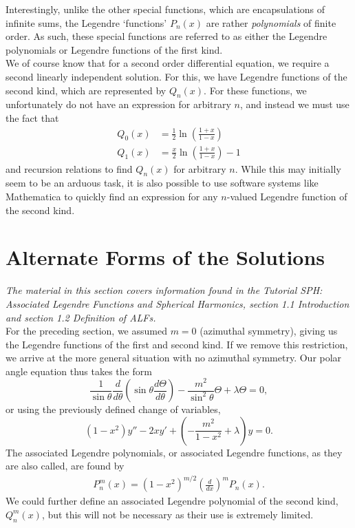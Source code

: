 \documentclass[11pt]{report}
\newcommand{\fpar}[1]{\left({#1}\right)}
\begin{document}
Interestingly, unlike the other special functions, which are encapsulations of infinite sums, the Legendre `functions' $P_n\fpar{x}$ are rather \emph{polynomials} of finite order. As such, these special functions are referred to as either the Legendre polynomials or Legendre functions of the first kind.\\

We of course know that for a second order differential equation, we require a second linearly independent solution. For this, we have Legendre functions of the second kind, which are represented by $Q_n(x)$. For these functions, we unfortunately do not have an expression for arbitrary $n$, and instead we must use the fact that
    \begin{align}
        Q_0(x) &= \frac{1}{2}\ln\fpar{\frac{1+x}{1-x}}\\
        Q_1(x) &= \frac{x}{2}\ln\fpar{\frac{1+x}{1-x}}-1
    \end{align}
and recursion relations to find $Q_n\fpar{x}$ for arbitrary $n$. While this may initially seem to be an arduous task, it is also possible to use software systems like Mathematica to quickly find an expression for any $n$-valued Legendre function of the second kind.

\section{Alternate Forms of the Solutions}

\emph{The material in this section covers information found in the Tutorial SPH: Associated Legendre Functions and Spherical Harmonics, section 1.1 Introduction and section 1.2 Definition of ALFs.}\\


For the preceding section, we assumed $m=0$ (azimuthal symmetry), giving us the Legendre functions of the first and second kind. If we remove this restriction, we arrive at the more general situation with no azimuthal symmetry. Our polar angle equation thus takes the form
    \begin{equation}
        \frac{1}{\sin{\theta}}\frac{d}{d\theta}\left(\sin{\theta}\frac{d\Theta}{d\theta}\right) - \frac{m^2}{\sin^2{\theta}}\Theta + \lambda\Theta = 0,
    \end{equation}
or using the previously defined change of variables,
    \begin{equation}
        \left(1-x^2\right)y'' - 2xy' + \left(- \frac{m^2}{1-x^2} + \lambda\right)y = 0.
    \end{equation}
The associated Legendre polynomials, or associated Legendre functions, as they are also called, are found by
    \begin{align}
        P^m_n\fpar{x} = \fpar{1-x^2}^{m/2}\fpar{\frac{d}{dx}}^m P_n\fpar{x}.
    \end{align}
We could further define an associated Legendre polynomial of the second kind, $Q_n^m\fpar{x}$, but this will not be necessary as their use is extremely limited.\\
\end{document}
